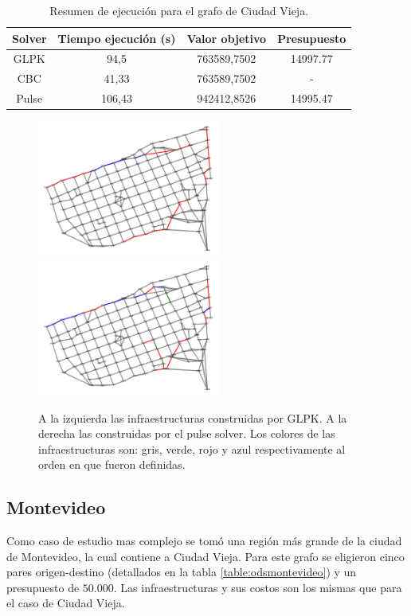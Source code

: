 \documentclass{article}
\begin{document}
  \begin{table}[h!]
    \centering
    \begin{tabular}{cccc}
      \toprule
      Solver & Tiempo ejecución (s) & Valor objetivo & Presupuesto \\
      \midrule
      GLPK & 94,5 & 763589,7502 & 14997.77 \\
      CBC & 41,33 & 763589,7502 & - \\
      Pulse & 106,43 & 942412,8526 & 14995.47 \\
      \bottomrule
    \end{tabular}
    \caption{Resumen de ejecución para el grafo de Ciudad Vieja.}\label{table:resultadosciudadvieja}
  \end{table}

  \begin{figure}[h!]
    \centering
    \includegraphics[width=6cm]{imgs/mdeo_med_glpk.png}
    \includegraphics[width=6cm]{imgs/mdeo_med_pulse.png}
    \caption{A la izquierda las infraestructuras construidas por GLPK. A la derecha las construidas por el pulse solver. Los colores de las infraestructuras son: gris, verde, rojo y azul respectivamente al orden en que fueron definidas.}
    \label{resultadosciudadvieja}
  \end{figure}

  \subsection*{Montevideo}

  Como caso de estudio mas complejo se tomó una región más grande de la ciudad de Montevideo, la cual contiene a Ciudad Vieja. Para este grafo se eligieron cinco pares origen-destino (detallados en la tabla \ref{table:odsmontevideo}) y un presupuesto de $50.000$. Las infraestructuras y sus costos son los mismas que para el caso de Ciudad Vieja.
\end{document}
